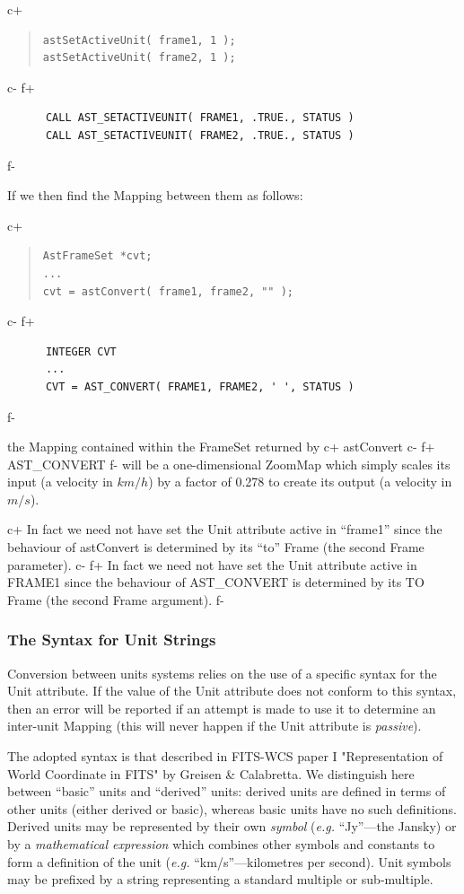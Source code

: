 \documentclass[twoside,11pt]{article}
\begin{document}
c+
\begin{quote}
\small
\begin{verbatim}
astSetActiveUnit( frame1, 1 );
astSetActiveUnit( frame2, 1 );
\end{verbatim}
\normalsize
\end{quote}
c-
f+
\small
\begin{verbatim}
      CALL AST_SETACTIVEUNIT( FRAME1, .TRUE., STATUS )
      CALL AST_SETACTIVEUNIT( FRAME2, .TRUE., STATUS )
\end{verbatim}
\normalsize
f-

If we then find the Mapping between them as follows:

c+
\begin{quote}
\small
\begin{verbatim}
AstFrameSet *cvt;
...
cvt = astConvert( frame1, frame2, "" );
\end{verbatim}
\normalsize
\end{quote}
c-
f+
\small
\begin{verbatim}
      INTEGER CVT
      ...
      CVT = AST_CONVERT( FRAME1, FRAME2, ' ', STATUS )
\end{verbatim}
\normalsize
f-

the Mapping contained within the FrameSet returned by
c+
astConvert
c-
f+
AST\_CONVERT
f-
will be a one-dimensional ZoomMap which simply scales its input (a
velocity in $km/h$) by a factor of 0.278 to create its output (a velocity
in $m/s$).

c+
In fact we need not have set the Unit attribute active in ``frame1''
since the behaviour of astConvert is determined by its ``to'' Frame
(the second Frame parameter).
c-
f+
In fact we need not have set the Unit attribute active in FRAME1
since the behaviour of AST\_CONVERT is determined by its TO Frame
(the second Frame argument).
f-

\subsubsection{\label{ss:unitsyntax}The Syntax for Unit Strings}
Conversion between units systems relies on the use of a specific syntax
for the Unit attribute. If the value of the Unit attribute does not
conform to this syntax, then an error will be reported if an attempt is
made to use it to determine an inter-unit Mapping (this will never happen
if the Unit attribute is \emph{passive}).

The adopted syntax is that described in FITS-WCS paper I "Representation
of World Coordinate in FITS" by Greisen \& Calabretta. We distinguish
here between ``basic'' units and ``derived'' units: derived units are
defined in terms of other units (either derived or basic), whereas basic
units have no such definitions. Derived units may be represented by their
own \emph{symbol} (\emph{e.g.} ``Jy''---the Jansky) or by a
\emph{mathematical expression} which combines other symbols and constants
to form a definition of the unit (\emph{e.g.} ``km/s''---kilometres per
second). Unit symbols may be prefixed by a string representing a standard
multiple or sub-multiple.
\end{document}

